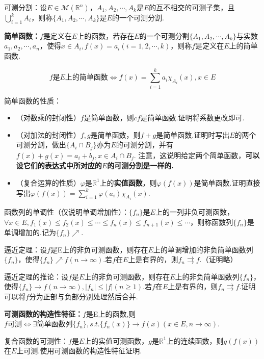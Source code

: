 \documentclass[bwprint, withoutpreface]{cumcmthesis}
\begin{document}
可测分割：设$E \in \mathcal{M}(\mathbb{R}^n)$，$A_1, A_2, \cdots, A_k$是$E$的互不相交的可测子集，且$\bigcup_{i = 1}^{k}{A_i}$，则称$\{A_1, A_2, \cdots, A_k\}$是$E$的一个可测分割.

\textbf{简单函数：}$f$是定义在$E$上的函数，若存在$E$的一个可测分割$\{A_1, A_2, \cdots, A_k\}$与实数$a_1,a_2,\cdots,a_n$，使得$x \in A_i, f(x) = a_i(i = 1, 2, \cdots, k)$，则称$f$是定义在$E$上的简单函数.

\begin{equation*}
	f \mbox{是$E$上的简单函数} \Leftrightarrow f(x) = \sum_{i = 1}^{k}{a_i \chi_{A_i}(x), x \in E}
\end{equation*}

简单函数的性质：
\begin{itemize}[itemindent=2em]
	\item （对数乘的封闭性）$f$是简单函数，则$cf$是简单函数.证明将系数更改即可.
	\item （对加法的封闭性）$f, g$是简单函数，则$f + g$是简单函数.证明时写出$E$的两个可测分割，做出$\{A_i \cap B_j\}$亦为$E$的可测分割，并有$f(x) + g(x) = a_i + b_j, x \in A_i \cap B_j$. 注意，这说明给定两个简单函数，\textbf{可以设它们的表达式中所对应的$E$的可测分割是一样的.}
	\item （复合运算的性质）$\varphi$是$\mathbb{R}^1$上的\textbf{实值函数}，则$\varphi(f(x))$是简单函数.证明直接写出$\varphi(f(x)) = \sum_{i = 1}^{k}{\varphi(a_i)\chi_{A_i}(x)}$.
\end{itemize}

函数列的单调性（仅说明单调增加性）：$\{f_n\}$是$E$上的一列非负可测函数，$\forall x \in E, f_1(x) \leqslant f_2(x) \leqslant \cdots \leqslant f_n(x) \leqslant f_{n + 1}(x) \leqslant \cdots$，则称函数列$\{f_n\}$是单调增加的.记为$\{f_n\} \nearrow$.

逼近定理：设$f$是E上的非负可测函数，则存在$E$上的单调增加的非负简单函数列$\{f_n\}$，使得$\{f_n\} \nearrow f(n \to \infty)$.若$f$在$E$上是有界的，则$f_n \rightrightarrows f$.（证明略）

逼近定理的推论：设$f$是$E$上的非负可测函数，则存在$E$上的非负简单函数列$\{f_n\}$，使得$\{f_n\} \to f(n \to \infty), |f_n| \leqslant |f|(n \geqslant 1)$.若$f$在$E$上是有界的，则$f_n \rightrightarrows f$.证明可以将$f$分为正部与负部分别处理然后合并.

\textbf{可测函数的构造性特征：}$f$是E上的函数,则$f\mbox{可测}\Leftrightarrow \exists \mbox{简单函数列} \{f_n\}, s.t. \{f_n(x)\} \to f(x) (x \in E, n \to \infty)$.

复合函数的可测性：$f$是$E$上的实值可测函数，$g$是$\mathbb{R}^1$上的连续函数，则$g(f(x))$在$E$上可测.使用可测函数的构造性特征证明.
\end{document}
